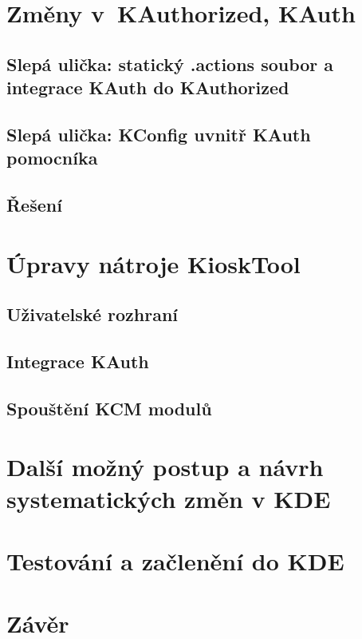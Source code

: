 \chapter{Změny v~KAuthorized, KAuth}
\section{Slepá ulička: statický .actions soubor a integrace KAuth do KAuthorized}
\section{Slepá ulička: KConfig uvnitř KAuth pomocníka}
\section{Řešení}
\chapter{Úpravy nátroje KioskTool}
\section{Uživatelské rozhraní}
\section{Integrace KAuth}
\section{Spouštění KCM modulů}
\chapter{Další možný postup a návrh systematických změn v KDE}
\chapter{Testování a začlenění do KDE}
\chapter{Závěr}
\cite{fitWeb}
